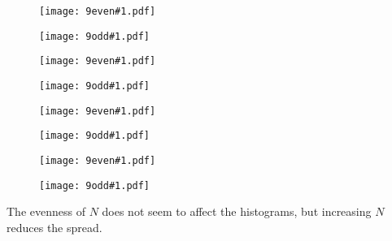 \newcommand{\ninefig}[1]{
\begin{figure}[!ht]
\centering
  \begin{minipage}[b]{0.24\textwidth}
    \texttt{[image: 9even\#1.pdf]}
  \end{minipage} \begin{minipage}[b]{0.24\textwidth}
    \texttt{[image: 9odd\#1.pdf]}
  \end{minipage}
\end{figure}
}

\ninefig{14}
\ninefig{36}
\ninefig{200}
\ninefig{10000}

The evenness of $N$ does not seem to affect the histograms, but increasing $N$ reduces the spread.